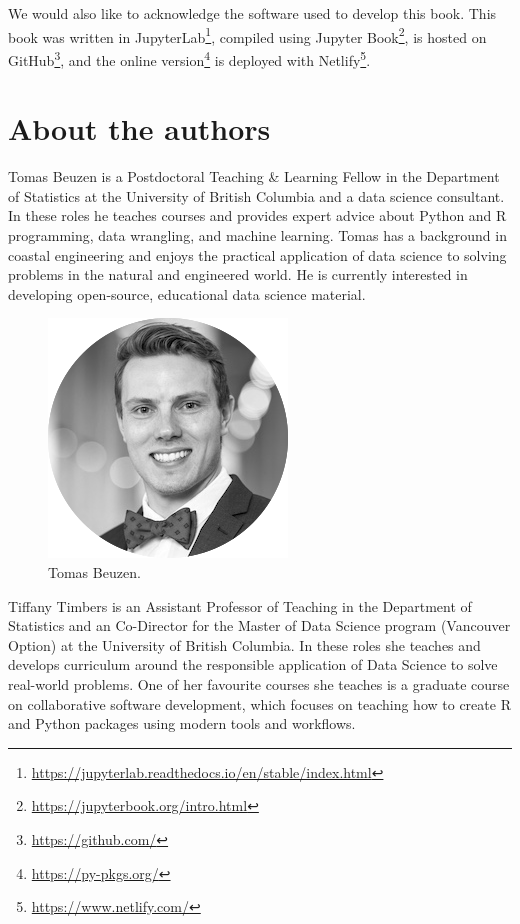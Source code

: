\documentclass[
]{krantz}
\renewcommand{\href}[2]{#2\footnote{\url{#1}}}
\begin{document}
We would also like to acknowledge the software used to develop this book. This book was written in \href{https://jupyterlab.readthedocs.io/en/stable/index.html}{JupyterLab}, compiled using \href{https://jupyterbook.org/intro.html}{Jupyter Book}, is hosted on \href{https://github.com/}{GitHub}, and the \href{https://py-pkgs.org/}{online version} is deployed with \href{https://www.netlify.com/}{Netlify}.

\hypertarget{about-the-authors}{%
\chapter*{About the authors}\label{about-the-authors}}


Tomas Beuzen is a Postdoctoral Teaching \& Learning Fellow in the Department of Statistics at the University of British Columbia and a data science consultant. In these roles he teaches courses and provides expert advice about Python and R programming, data wrangling, and machine learning. Tomas has a background in coastal engineering and enjoys the practical application of data science to solving problems in the natural and engineered world. He is currently interested in developing open-source, educational data science material.

\begin{figure}

{\centering \includegraphics[width=0.3\linewidth]{../images/tomas-beuzen} 

}

\caption{Tomas Beuzen.}\label{fig:00-tomas-beuzen}
\end{figure}

Tiffany Timbers is an Assistant Professor of Teaching in the Department of Statistics and an Co-Director for the Master of Data Science program (Vancouver Option) at the University of British Columbia. In these roles she teaches and develops curriculum around the responsible application of Data Science to solve real-world problems. One of her favourite courses she teaches is a graduate course on collaborative software development, which focuses on teaching how to create R and Python packages using modern tools and workflows.
\end{document}
